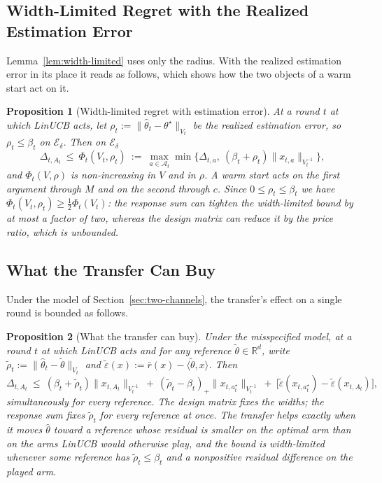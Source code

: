 \documentclass{article}
\newtheorem{proposition}{Proposition}
\theoremstyle{definition}
\theoremstyle{remark}
\newcommand{\R}{\mathbb{R}}
\theoremstyle{remark}
\begin{document}
\subsection{Width-Limited Regret with the Realized Estimation Error}
\label{app:two-objects}

Lemma~\ref{lem:width-limited} uses only the radius. With the realized
estimation error in its place it reads as follows, which shows how the two
objects of a warm start act on it.

\begin{proposition}[Width-limited regret with estimation error]
\label{prop:two-channel}
At a round $t$ at which LinUCB acts, let
$\rho_t:=\|\widehat\theta_t-\theta^\star\|_{V_t}$ be the realized estimation
error, so $\rho_t\le\beta_t$ on $\mathcal E_\delta$. Then on $\mathcal E_\delta$
\begin{equation}
\label{eq:phi-two}
\Delta_{t,A_t}\ \le\ \Phi_t(V_t,\rho_t)\ :=\
\max_{a\in\mathcal A_t}\min\bigl\{\Delta_{t,a},\ (\beta_t+\rho_t)\|x_{t,a}\|_{V_t^{-1}}\bigr\},
\end{equation}
and $\Phi_t(V,\rho)$ is non-increasing in $V$ and in $\rho$. A warm start acts
on the first argument through $M$ and on the second through $c$. Since
$0\le\rho_t\le\beta_t$ we have $\Phi_t(V_t,\rho_t)\ge\tfrac12\Phi_t(V_t)$: the
response sum can tighten the width-limited bound by at most a factor of two,
whereas the design matrix can reduce it by the price ratio, which is unbounded.
\end{proposition}

\subsection{What the Transfer Can Buy}
\label{app:transfer-regret}

Under the model of Section~\ref{sec:two-channels}, the transfer's effect on a
single round is bounded as follows.

\begin{proposition}[What the transfer can buy]
\label{prop:transfer-regret}
Under the misspecified model, at a round $t$ at which LinUCB acts and for any
reference $\widetilde\theta\in\R^d$, write
$\widetilde\rho_t:=\|\widehat\theta_t-\widetilde\theta\|_{V_t}$ and
$\widetilde\varepsilon(x):=\bar r(x)-\langle\widetilde\theta,x\rangle$. Then
\[
\Delta_{t,A_t}\ \le\ (\beta_t+\widetilde\rho_t)\|x_{t,A_t}\|_{V_t^{-1}}
\ +\ (\widetilde\rho_t-\beta_t)_+\|x_{t,a^\star_t}\|_{V_t^{-1}}
\ +\ \bigl[\widetilde\varepsilon(x_{t,a^\star_t})-\widetilde\varepsilon(x_{t,A_t})\bigr],
\]
simultaneously for every reference. The design matrix fixes the widths; the
response sum fixes $\widetilde\rho_t$ for every reference at once. The
transfer helps exactly when it moves $\widehat\theta$ toward a reference whose
residual is smaller on the optimal arm than on the arms LinUCB would otherwise
play, and the bound is width-limited whenever some reference has
$\widetilde\rho_t\le\beta_t$ and a nonpositive residual difference on the
played arm.
\end{proposition}
\end{document}

